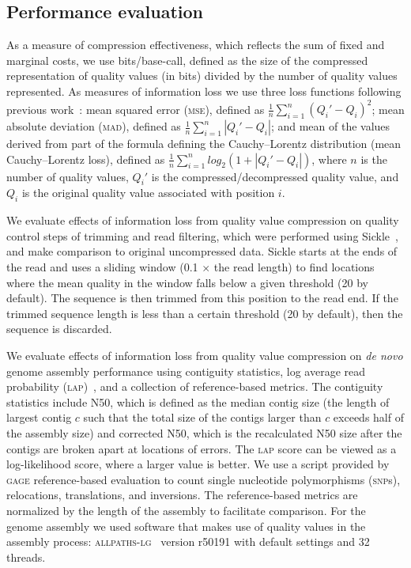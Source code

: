 \documentclass[fleqn,10pt,lineno]{wlpeerj} %
\begin{document}
\subsection*{Performance evaluation}

As a measure of compression effectiveness, which reflects the sum of
fixed and marginal costs, we use bits/base-call, defined as the size
of the compressed representation of quality values (in bits) divided
by the number of quality values represented. As measures of
information loss we use three loss functions following previous
work~\citep{Malysa01102015}: mean squared error (\textsc{mse}), defined
as $\frac{1}{n}\sum_{i=1}^{n}{(Q_i'-Q_i)^2}$; mean absolute deviation
(\textsc{mad}), defined as $\frac{1}{n}\sum_{i=1}^{n}{|Q_i'-Q_i|}$;
and mean of the values derived from part of the formula defining the
Cauchy--Lorentz distribution (mean Cauchy--Lorentz loss), defined as
$\frac{1}{n}\sum_{i=1}^{n}{log_{2}(1 + |Q_i'-Q_i|)}$, where $n$ is the
number of quality values, $Q_i'$ is the compressed/decompressed
quality value, and $Q_i$ is the original quality value associated with
position $i$.

We evaluate effects of information loss from quality value compression
on quality control steps of trimming and read filtering, which were
performed using Sickle~\citep{sickle}, and make comparison to original
uncompressed data. Sickle starts at the ends of the read and uses a
sliding window (0.1 $\times$ the read length) to find locations where
the mean quality in the window falls below a given threshold (20 by
default). The sequence is then trimmed from this position to the read
end. If the trimmed sequence length is less than a certain threshold
(20 by default), then the sequence is discarded.

We evaluate effects of information loss from quality value compression
on \emph{de novo} genome assembly performance using contiguity
statistics, log average read probability
(\textsc{lap})~\citep{Ghodsi:2013hb}, and a collection of
reference-based metrics. The contiguity statistics include N50, which
is defined as the median contig size (the length of largest contig $c$
such that the total size of the contigs larger than $c$ exceeds half
of the assembly size) and corrected N50, which is the recalculated N50
size after the contigs are broken apart at locations of errors. The
\textsc{lap} score can be viewed as a log-likelihood score, where a
larger value is better. We use a script provided by \textsc{gage}
reference-based evaluation to count single nucleotide polymorphisms
(\textsc{snp}s), relocations, translations, and inversions. The
reference-based metrics are normalized by the length of the assembly
to facilitate comparison. For the genome assembly we used software
that makes use of quality values in the assembly process:
\textsc{allpaths-lg}~\citep{Gnerre:2011kx} version r50191 with default
settings and 32 threads.
\end{document}
